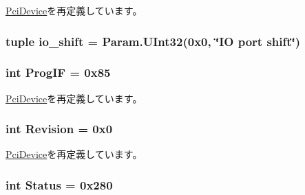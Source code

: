 \hyperlink{classPci_1_1PciDevice_a5b633242454258f93682fd8b05d934a1}{PciDevice}を再定義しています。\hypertarget{classIde_1_1IdeController_a70540016105bd47dacafa00f2930da88}{
\subsubsection[{io\_\-shift}]{\setlength{\rightskip}{0pt plus 5cm}tuple {\bf io\_\-shift} = Param.UInt32(0x0, \char`\"{}IO port shift\char`\"{})}}
\label{classIde_1_1IdeController_a70540016105bd47dacafa00f2930da88}
\hypertarget{classIde_1_1IdeController_aa63e82532e33e89795f472cfb7e0bb67}{
\subsubsection[{ProgIF}]{\setlength{\rightskip}{0pt plus 5cm}int {\bf ProgIF} = 0x85}}
\label{classIde_1_1IdeController_aa63e82532e33e89795f472cfb7e0bb67}


\hyperlink{classPci_1_1PciDevice_ae1b2d8ef2a839fabf99be35121a8b6e8}{PciDevice}を再定義しています。\hypertarget{classIde_1_1IdeController_a1c872d7167f0869b85418babe0ca6ced}{
\subsubsection[{Revision}]{\setlength{\rightskip}{0pt plus 5cm}int {\bf Revision} = 0x0}}
\label{classIde_1_1IdeController_a1c872d7167f0869b85418babe0ca6ced}


\hyperlink{classPci_1_1PciDevice_a3e8a079e8f2eda26d5e301091db1f5ee}{PciDevice}を再定義しています。\hypertarget{classIde_1_1IdeController_ae58c2415cf1178457fa1254234c3f017}{
\subsubsection[{Status}]{\setlength{\rightskip}{0pt plus 5cm}int {\bf Status} = 0x280}}
\label{classIde_1_1IdeController_ae58c2415cf1178457fa1254234c3f017}


